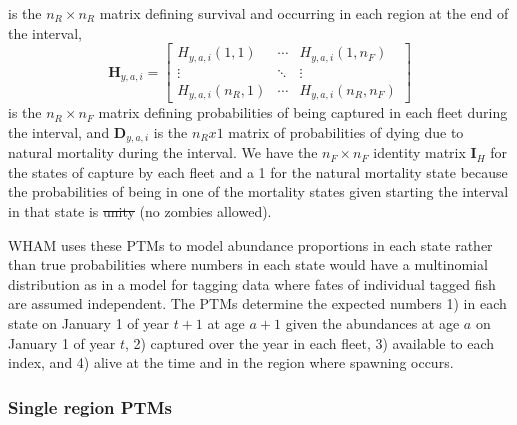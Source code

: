 \documentclass[
]{article}
\makeatletter
\providecommand{\DIFaddtex}[1]{{\protect\color{blue}\uwave{#1}}} %
\providecommand{\DIFdeltex}[1]{{\protect\color{red}\sout{#1}}} %
\providecommand{\DIFaddbegin}{} %
\providecommand{\DIFaddend}{} %
\providecommand{\DIFdelbegin}{} %
\providecommand{\DIFdelend}{} %
\providecommand{\DIFadd}[1]{\texorpdfstring{\DIFaddtex{#1}}{#1}} %
\providecommand{\DIFdel}[1]{\texorpdfstring{\DIFdeltex{#1}}{}} %
\newcommand{\DIFscaledelfig}{0.5}
\newlength{\DIFdelgraphicswidth} %
\newlength{\DIFdelgraphicsheight} %
\newcommand{\DIFaddincludegraphics}[2][]{{\color{blue}\fbox{\DIFOincludegraphics[#1]{#2}}}} %
\newcommand{\DIFdelincludegraphics}[2][]{%
\sbox{\DIFdelgraphicsbox}{\DIFOincludegraphics[#1]{#2}}%
\settoboxwidth{\DIFdelgraphicswidth}{\DIFdelgraphicsbox} %
\settoboxtotalheight{\DIFdelgraphicsheight}{\DIFdelgraphicsbox} %
\scalebox{\DIFscaledelfig}{%
\parbox[b]{\DIFdelgraphicswidth}{\usebox{\DIFdelgraphicsbox}\\[-\baselineskip] \rule{\DIFdelgraphicswidth}{0em}}\llap{\resizebox{\DIFdelgraphicswidth}{\DIFdelgraphicsheight}{%
\setlength{\unitlength}{\DIFdelgraphicswidth}%
\begin{picture}(1,1)%
\thicklines\linethickness{2pt} %
{\color[rgb]{1,0,0}\put(0,0){\framebox(1,1){}}}%
{\color[rgb]{1,0,0}\put(0,0){\line( 1,1){1}}}%
{\color[rgb]{1,0,0}\put(0,1){\line(1,-1){1}}}%
\end{picture}%
}\hspace*{3pt}}} %
} %
\DeclareRobustCommand{\DIFaddbegin}{\DIFOaddbegin \let\includegraphics\DIFaddincludegraphics} %
\DeclareRobustCommand{\DIFaddend}{\DIFOaddend \let\includegraphics\DIFOincludegraphics} %
\DeclareRobustCommand{\DIFdelbegin}{\DIFOdelbegin \let\includegraphics\DIFdelincludegraphics} %
\DeclareRobustCommand{\DIFdelend}{\DIFOaddend \let\includegraphics\DIFOincludegraphics} %
\let\sout@orig\sout %
\renewcommand{\sout}[1]{\ifmmode\text{\sout@orig{\ensuremath{#1}}}\else\sout@orig{#1}\fi} %
\makeatother
\begin{document}
is the \(n_R \times n_R\) matrix defining survival and occurring in each region at the end of the interval,
\begin{equation*} 
  \mathbf{H}_{y,a,i} = 
  \begin{bmatrix}
    H_{y,a,i}(1,1) & \cdots & H_{y,a,i}(1,n_F) \\
    \vdots & \ddots & \vdots \\
    H_{y,a,i}(n_R,1) & \cdots & H_{y,a,i}(n_R,n_F)
  \end{bmatrix}
\end{equation*}
is the \(n_R \times n_F\) matrix defining probabilities of being captured in each fleet during the interval, and \(\mathbf{D}_{y,a,i}\) is the \DIFdelbegin \DIFdel{\(n_R x 1\) }\DIFdelend \DIFaddbegin \DIFadd{\(n_R \times 1\) }\DIFaddend matrix of probabilities of dying due to natural mortality during the interval. We have the \(n_F\times n_F\) identity matrix \(\mathbf{I}_{H}\) for the states of capture by each fleet and a 1 for the natural mortality state because the probabilities of being in one of the mortality states given starting the interval in that state is \DIFdelbegin \DIFdel{unity }\DIFdelend \DIFaddbegin \DIFadd{one }\DIFaddend (no zombies allowed).

WHAM uses these PTMs to model abundance proportions in each state rather than true probabilities where numbers in each state would have a multinomial distribution as in a model for tagging data where fates of individual tagged fish are assumed independent. The PTMs determine the expected numbers 1) in each state on January 1 of year \DIFdelbegin \DIFdel{\(t+1\) }\DIFdelend \DIFaddbegin \DIFadd{\(y+1\) }\DIFaddend at age \(a+1\) given the abundances at age \(a\) on January 1 of year \DIFdelbegin \DIFdel{\(t\)}\DIFdelend \DIFaddbegin \DIFadd{\(y\)}\DIFaddend , 2) captured over the year in each fleet, 3) available to each index, and 4) alive at the time and in the region where spawning occurs.

\hypertarget{single-region-ptms}{%
\subsubsection*{Single region PTMs}\label{single-region-ptms}}
\end{document}

